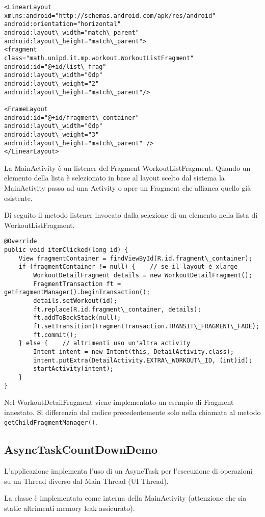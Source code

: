 \begin{lstlisting}
<LinearLayout xmlns:android="http://schemas.android.com/apk/res/android"
android:orientation="horizontal"
android:layout\_width="match\_parent"
android:layout\_height="match\_parent">
<fragment
class="math.unipd.it.mp.workout.WorkoutListFragment"
android:id="@+id/list\_frag"
android:layout\_width="0dp"
android:layout\_weight="2"
android:layout\_height="match\_parent"/>

<FrameLayout
android:id="@+id/fragment\_container"
android:layout\_width="0dp"
android:layout\_weight="3"
android:layout\_height="match\_parent" />
</LinearLayout>
\end{lstlisting}

La MainActivity è un listener del Fragment WorkoutListFragment. Quando un elemento della lista è selezionato in base al layout scelto dal sistema la MainActivity passa ad una Activity o apre un Fragment che affianca quello già esistente.

Di seguito il metodo listener invocato dalla selezione di un elemento nella lista di WorkoutListFragment.

\begin{lstlisting}
@Override
public void itemClicked(long id) {
	View fragmentContainer = findViewById(R.id.fragment\_container);
	if (fragmentContainer != null) {	// se il layout è xlarge
		WorkoutDetailFragment details = new WorkoutDetailFragment();
		FragmentTransaction ft = getFragmentManager().beginTransaction();
		details.setWorkout(id);
		ft.replace(R.id.fragment\_container, details);
		ft.addToBackStack(null);
		ft.setTransition(FragmentTransaction.TRANSIT\_FRAGMENT\_FADE);
		ft.commit();
	} else {	// altrimenti uso un'altra activity
		Intent intent = new Intent(this, DetailActivity.class);
		intent.putExtra(DetailActivity.EXTRA\_WORKOUT\_ID, (int)id);
		startActivity(intent);
	}
}
\end{lstlisting}

Nel WorkoutDetailFragment viene implementato un esempio di Fragment innestato. Si differenzia dal codice precedentemente solo nella chiamata al metodo \lstinline|getChildFragmentManager()|.


\subsection{AsyncTaskCountDownDemo}
L'applicazione implementa l'uso di un AsyncTask per l'esecuzione di operazioni su un Thread diverso dal Main Thread (UI Thread).

La classe è implementata come interna della MainActivity (attenzione che sia static altrimenti memory leak assicurato).

